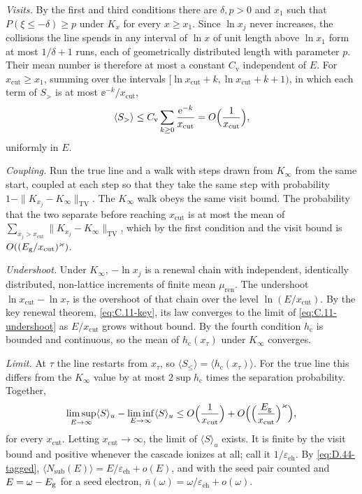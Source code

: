 \emph{Visits.} By the first and third conditions there are $\delta, p > 0$ and $x_1$ such that $P(\xi \le -\delta) \ge p$ under $K_x$ for every $x \ge x_1$. Since $\ln x_j$ never increases, the collisions the line spends in any interval of $\ln x$ of unit length above $\ln x_1$ form at most $1/\delta + 1$ runs, each of geometrically distributed length with parameter $p$. Their mean number is therefore at most a constant $C_{\mathrm{v}}$ independent of $E$. For $x_{\mathrm{cut}} \ge x_1$, summing over the intervals $[\ln x_{\mathrm{cut}} + k, \ln x_{\mathrm{cut}} + k + 1)$, in which each term of $S_>$ is at most $\ee^{-k}/x_{\mathrm{cut}}$,
\begin{equation*}
  \langle S_>\rangle \le C_{\mathrm{v}}\sum_{k \ge 0}\frac{\mathrm{e}^{-k}}{x_{\mathrm{cut}}} = O\Bigl(\frac{1}{x_{\mathrm{cut}}}\Bigr) ,
\end{equation*}
uniformly in $E$.

\emph{Coupling.} Run the true line and a walk with steps drawn from $K_\infty$ from the same start, coupled at each step so that they take the same step with probability $1 - \|K_{x_j} - K_\infty\|_{\mathrm{TV}}$. The $K_\infty$ walk obeys the same visit bound. The probability that the two separate before reaching $x_{\mathrm{cut}}$ is at most the mean of $\sum_{x_j > x_{\mathrm{cut}}}\|K_{x_j} - K_\infty\|_{\mathrm{TV}}$, which by the first condition and the visit bound is $O((E_{\mathrm{g}}/x_{\mathrm{cut}})^\varkappa)$.

\emph{Undershoot.} Under $K_\infty$, $-\ln x_j$ is a renewal chain with independent, identically distributed, non-lattice increments of finite mean $\mu_{\mathrm{ren}}$. The undershoot $\ln x_{\mathrm{cut}} - \ln x_\tau$ is the overshoot of that chain over the level $\ln(E/x_{\mathrm{cut}})$. By the key renewal theorem, \cref{eq:C.11-key}, its law converges to the limit of \cref{eq:C.11-undershoot} as $E/x_{\mathrm{cut}}$ grows without bound. By the fourth condition $h_{\mathrm{c}}$ is bounded and continuous, so the mean of $h_{\mathrm{c}}(x_\tau)$ under $K_\infty$ converges.

\emph{Limit.} At $\tau$ the line restarts from $x_\tau$, so $\langle S_\le\rangle = \langle h_{\mathrm{c}}(x_\tau)\rangle$. For the true line this differs from the $K_\infty$ value by at most $2\sup h_{\mathrm{c}}$ times the separation probability. Together,
\begin{equation*}
  \limsup_{E\to\infty}\langle S\rangle_u - \liminf_{E\to\infty}\langle S\rangle_u \le O\Bigl(\frac{1}{x_{\mathrm{cut}}}\Bigr) + O\Bigl(\Bigl(\frac{E_{\mathrm{g}}}{x_{\mathrm{cut}}}\Bigr)^\varkappa\Bigr) ,
\end{equation*}
for every $x_{\mathrm{cut}}$. Letting $x_{\mathrm{cut}} \to \infty$, the limit of $\langle S\rangle_u$ exists. It is finite by the visit bound and positive whenever the cascade ionizes at all; call it $1/\varepsilon_{\mathrm{eh}}$. By \cref{eq:D.44-tagged}, $\langle N_{\mathrm{sub}}(E)\rangle = E/\varepsilon_{\mathrm{eh}} + o(E)$, and with the seed pair counted and $E = \omega - E_{\mathrm{g}}$ for a seed electron, $\bar n(\omega) = \omega/\varepsilon_{\mathrm{eh}} + o(\omega)$.

